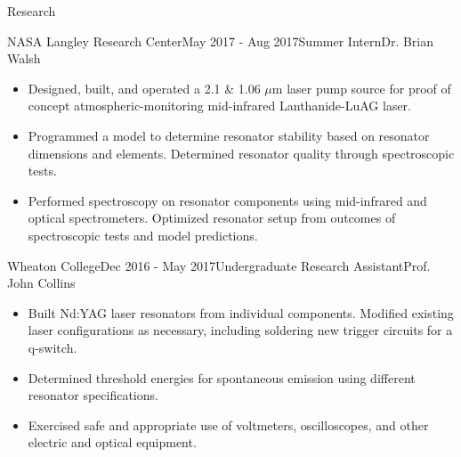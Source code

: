 \documentclass{resume} %
\begin{document}
\begin{rSection}{Research}
\begin{rSubsection}{NASA Langley Research Center}{May 2017 - Aug 2017}{Summer Intern}{Dr. Brian Walsh}
\begin{itemize}
\item Designed, built, and operated a 2.1 \& 1.06 $\mu$m laser pump source for proof of concept atmospheric-monitoring mid-infrared Lanthanide-LuAG laser.
\item Programmed a model to determine resonator stability based on resonator dimensions and elements. Determined resonator quality through spectroscopic tests.
\item Performed spectroscopy on resonator components using mid-infrared and optical spectrometers. Optimized resonator setup from outcomes of spectroscopic tests and model predictions.
\end{itemize}
\end{rSubsection}

\begin{rSubsection}{Wheaton College}{Dec 2016 - May 2017}{Undergraduate Research Assistant}{Prof. John Collins}
\begin{itemize}
\item Built Nd:YAG laser resonators from individual components. Modified existing laser configurations as necessary, including soldering new trigger circuits for a q-switch.
\item  Determined threshold energies for spontaneous emission using different resonator specifications.
\item Exercised safe and appropriate use of voltmeters, oscilloscopes, and other electric and optical equipment.
\end{itemize}
\end{rSubsection}
\end{rSection}
\end{document}
